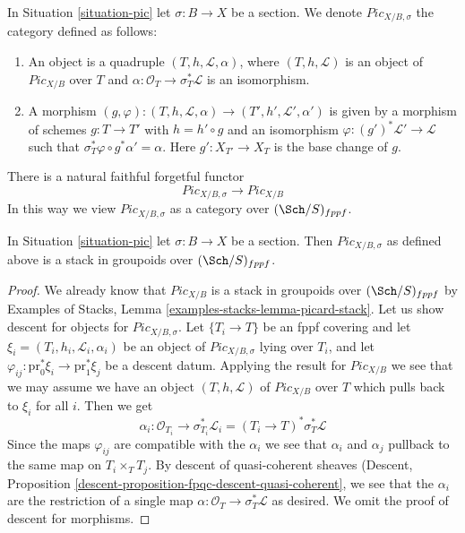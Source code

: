 \noindent
In Situation \ref{situation-pic} let $\sigma : B \to X$ be a section.
We denote $\textit{Pic}_{X/B, \sigma}$ the category defined as follows:
\begin{enumerate}
\item An object is a quadruple $(T, h, \mathcal{L}, \alpha)$, where
$(T, h, \mathcal{L})$ is an object of $\textit{Pic}_{X/B}$ over $T$ and
$\alpha : \mathcal{O}_T \to \sigma_T^*\mathcal{L}$
is an isomorphism.
\item A morphism $(g, \varphi) : (T, h, \mathcal{L}, \alpha)
\to (T', h', \mathcal{L}', \alpha')$
is given by a morphism of schemes $g : T \to T'$ with $h = h' \circ g$
and an isomorphism $\varphi : (g')^*\mathcal{L}' \to \mathcal{L}$
such that $\sigma_T^*\varphi \circ g^*\alpha' = \alpha$.
Here $g' : X_{T'} \to X_T$ is the base change of $g$.
\end{enumerate}
There is a natural faithful forgetful functor
$$
\textit{Pic}_{X/B, \sigma} \longrightarrow
\textit{Pic}_{X/B}
$$
In this way we view $\textit{Pic}_{X/B, \sigma}$ as a category
over $(\Sch/S)_{fppf}$.

\begin{lemma}
\label{lemma-pic-with-section-stack}
In Situation \ref{situation-pic} let $\sigma : B \to X$ be a section.
Then $\textit{Pic}_{X/B, \sigma}$ as defined above is a stack in
groupoids over $(\Sch/S)_{fppf}$.
\end{lemma}

\begin{proof}
We already know that $\textit{Pic}_{X/B}$ is a stack in groupoids
over $(\Sch/S)_{fppf}$ by
Examples of Stacks, Lemma \ref{examples-stacks-lemma-picard-stack}.
Let us show descent for objects for $\textit{Pic}_{X/B, \sigma}$.
Let $\{T_i \to T\}$ be an fppf covering and let
$\xi_i = (T_i, h_i, \mathcal{L}_i, \alpha_i)$ be an object of
$\textit{Pic}_{X/B, \sigma}$ lying over $T_i$, and let
$\varphi_{ij} : \text{pr}_0^*\xi_i \to \text{pr}_1^*\xi_j$
be a descent datum. Applying the result for $\textit{Pic}_{X/B}$
we see that we may assume we have an object $(T, h, \mathcal{L})$
of $\textit{Pic}_{X/B}$ over $T$ which pulls back to $\xi_i$ for all $i$.
Then we get
$$
\alpha_i : \mathcal{O}_{T_i} \to \sigma_{T_i}^*\mathcal{L}_i =
(T_i \to T)^*\sigma_T^*\mathcal{L}
$$
Since the maps $\varphi_{ij}$ are compatible with the $\alpha_i$
we see that $\alpha_i$ and $\alpha_j$ pullback to the same map
on $T_i \times_T T_j$. By descent of quasi-coherent sheaves
(Descent, Proposition \ref{descent-proposition-fpqc-descent-quasi-coherent},
we see that the $\alpha_i$ are the restriction of a single map
$\alpha : \mathcal{O}_T \to \sigma_T^*\mathcal{L}$ as desired.
We omit the proof of descent for morphisms.
\end{proof}

